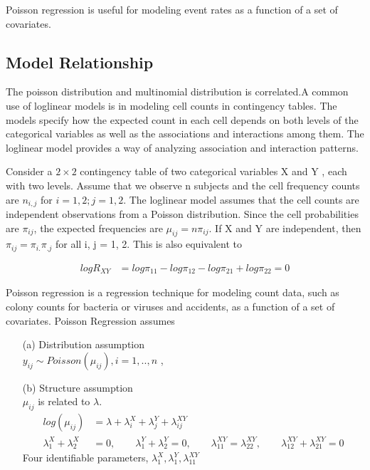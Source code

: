 Poisson regression is useful for modeling event rates as a function of a set of covariates.

\subsection{Model Relationship}
The poisson distribution and multinomial distribution is correlated.A common use of loglinear models is in modeling cell counts in contingency tables. The models specify how the expected count in each cell depends on both levels of the categorical variables as well as the associations and interactions among them. The loglinear model provides a way of analyzing association and interaction patterns.

Consider a $2 \times 2$ contingency table of two categorical variables X and Y , each with two levels. Assume that we observe n subjects and the cell frequency counts are $n_{i,j}$ for $i = 1, 2; j = 1, 2$. The loglinear model assumes that the cell counts are independent observations from a Poisson distribution. Since the cell probabilities are $\pi_{ij}$, the expected frequencies are ${\mu_{ij} = n \pi_{ij}}$. If X and Y are independent, then $\pi_{ij} = \pi_{i.} \pi_{.j}$ for all i, j = 1, 2. This is also equivalent to

 \begin{align*}
   log R_{XY} &= log \pi_{11} - log \pi_{12} - log \pi_{21} + log \pi_{22} = 0
\end{align*}


Poisson regression is a regression technique for modeling count data, such as colony counts for bacteria or viruses and accidents, as a function of a set of covariates.
Poisson Regression assumes
\begin{itemize}
\item[(a)] Distribution assumption\\
$y_{ij} \sim Poisson(\mu_{ij}), i = 1, .., n$ , 

\item[(b)] Structure assumption\\
$\mu_{ij}$ is related to $\lambda$. 
   \begin{align*}
  log(\mu_{ij}) &= \lambda + \lambda_i^X + \lambda_j^Y + \lambda_{ij}^{XY}\\
\lambda_1^X + \lambda_2^X &= 0, \qquad \lambda_1^Y + \lambda_2^Y = 0, \qquad \lambda_{11}^{XY} = \lambda_{22}^{XY} , \qquad \lambda_{12}^{XY} + \lambda_{21}^{XY} = 0
\end{align*}
Four identifiable parameters, $\lambda_1^X, \lambda_1^Y, \lambda_{11}^{XY}$

\end{itemize}

